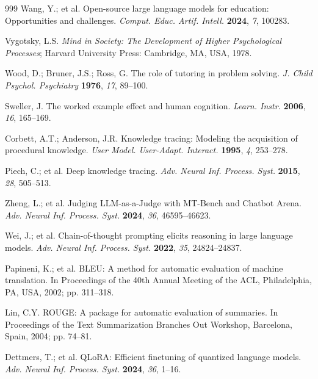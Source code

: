 \documentclass[journal,article,submit,pdftex,moreauthors]{Definitions/mdpi}
\begin{document}
\begin{thebibliography}{999}
Wang, Y.; et al. Open-source large language models for education: Opportunities and challenges. \textit{Comput. Educ. Artif. Intell.} \textbf{2024}, \textit{7}, 100283.

Vygotsky, L.S. \textit{Mind in Society: The Development of Higher Psychological Processes}; Harvard University Press: Cambridge, MA, USA, 1978.

Wood, D.; Bruner, J.S.; Ross, G. The role of tutoring in problem solving. \textit{J. Child Psychol. Psychiatry} \textbf{1976}, \textit{17}, 89--100.

Sweller, J. The worked example effect and human cognition. \textit{Learn. Instr.} \textbf{2006}, \textit{16}, 165--169.

Corbett, A.T.; Anderson, J.R. Knowledge tracing: Modeling the acquisition of procedural knowledge. \textit{User Model. User-Adapt. Interact.} \textbf{1995}, \textit{4}, 253--278.

Piech, C.; et al. Deep knowledge tracing. \textit{Adv. Neural Inf. Process. Syst.} \textbf{2015}, \textit{28}, 505--513.

Zheng, L.; et al. Judging LLM-as-a-Judge with MT-Bench and Chatbot Arena. \textit{Adv. Neural Inf. Process. Syst.} \textbf{2024}, \textit{36}, 46595--46623.

Wei, J.; et al. Chain-of-thought prompting elicits reasoning in large language models. \textit{Adv. Neural Inf. Process. Syst.} \textbf{2022}, \textit{35}, 24824--24837.

Papineni, K.; et al. BLEU: A method for automatic evaluation of machine translation. In Proceedings of the 40th Annual Meeting of the ACL, Philadelphia, PA, USA, 2002; pp. 311--318.

Lin, C.Y. ROUGE: A package for automatic evaluation of summaries. In Proceedings of the Text Summarization Branches Out Workshop, Barcelona, Spain, 2004; pp. 74--81.

Dettmers, T.; et al. QLoRA: Efficient finetuning of quantized language models. \textit{Adv. Neural Inf. Process. Syst.} \textbf{2024}, \textit{36}, 1--16.

\end{thebibliography}
\end{document}
